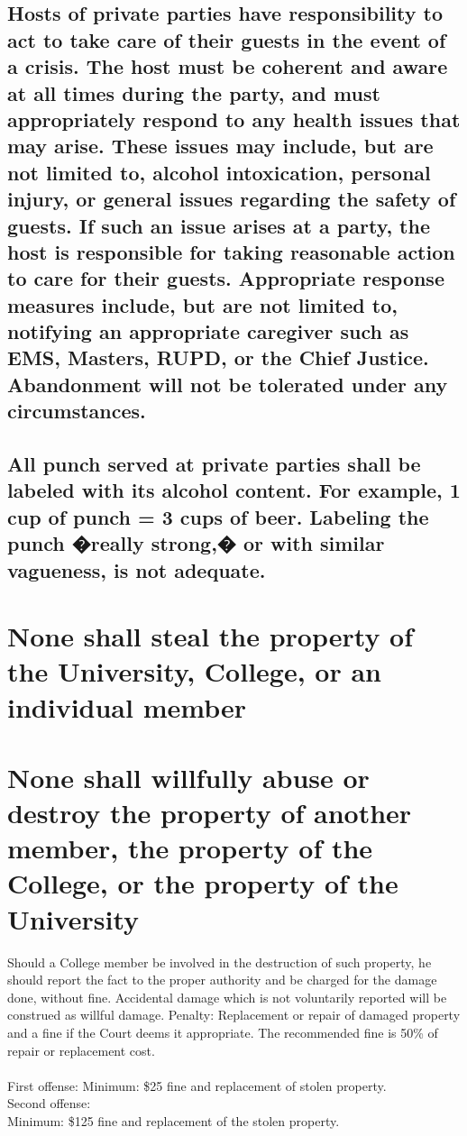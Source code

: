 \documentclass[11pt]{article}
\begin{document}
\subsection{Hosts of private parties have responsibility to act to take care of their guests in the event of a crisis. The host must be coherent and aware at all times during the party, and must appropriately respond to any health issues that may arise. These issues may include, but are not limited to, alcohol intoxication, personal injury, or general issues regarding the safety of guests. If such an issue arises at a party, the host is responsible for taking reasonable action to care for their guests. Appropriate response measures include, but are not limited to, notifying an appropriate caregiver such as EMS, Masters, RUPD, or the Chief Justice. Abandonment will not be tolerated under any circumstances.}
\subsection{All punch served at private parties shall be labeled with its alcohol content. For example, 1 cup of punch = 3 cups of beer. Labeling the punch �really strong,� or with similar vagueness, is not adequate.}

\section{\textbf{None shall steal the property of the University, College, or an individual member}}

\section{\textbf{None shall willfully abuse or destroy the property of another member, the property of the 	College, or the property of the University}}
Should a College member be involved in the destruction of such property, he should report the fact to the proper authority and be charged for the damage done, without fine. Accidental damage which is not voluntarily reported will be construed as willful damage.
Penalty: Replacement or repair of damaged property and a fine if the Court deems it appropriate. The recommended fine is 50\% of repair or replacement cost.\\ \\
First offense:
Minimum: \$25 fine and replacement of stolen property.\\ Second offense:\\
Minimum: \$125 fine and replacement of the stolen property.
\end{document}
